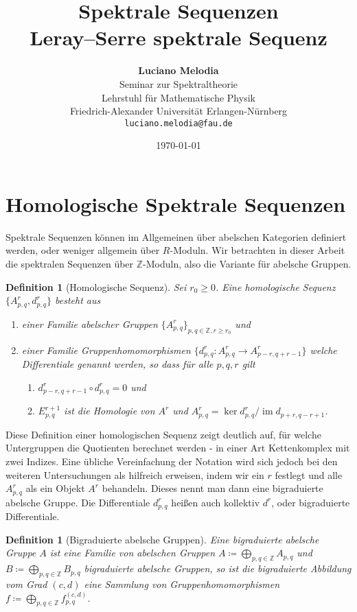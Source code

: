\documentclass[12pt, hidelinks]{article}
\title{\textbf{Spektrale Sequenzen\\ Leray–Serre spektrale Sequenz}}
\author{
\textbf{Luciano Melodia} \\
Seminar zur Spektraltheorie \\
Lehrstuhl für Mathematische Physik \\
Friedrich-Alexander Universität Erlangen-Nürnberg \\
\texttt{luciano.melodia@fau.de}}
\date{\today}
\numberwithin{conj}{section}
\newtheorem{definition}[conj]{Definition}
\newcommand{\Z}{\mathbb{Z}}
\newcommand{\ima}{\operatorname{im}}
\begin{document}
\hypersetup{bookmarksnumbered=true,}
\maketitle

\begin{Large}
\tableofcontents
\end{Large}

\section{Homologische Spektrale Sequenzen}
Spektrale Sequenzen können im Allgemeinen über abelschen Kategorien definiert werden, oder weniger allgemein über $R$-Moduln. Wir betrachten in dieser Arbeit die spektralen Sequenzen über $\mathbb{Z}$-Moduln, also die Variante für abelsche Gruppen.

\begin{definition}[Homologische Sequenz]
\label{homologischeSequenz}
Sei $r_0 \geq 0$. Eine homologische Sequenz $\{A^r_{p,q}, d^r_{p,q}\}$ besteht aus
\begin{enumerate}[nolistsep]
    \item einer Familie abelscher Gruppen $\{A^r_{p,q}\}_{p,q \in \Z, r \geq r_0}$ und
    \item einer Familie Gruppenhomomorphismen $\{d^r_{p,q}: A^r_{p,q} \to A^r_{p-r,q+r-1}\}$ welche Differentiale genannt werden, so dass für alle $p,q,r$ gilt
    \begin{enumerate}[nolistsep]
        \item $d^r_{p-r,q+r-1} \circ d^r_{p,q} = 0$ und
        \item $E^{r+1}_{p,q}$ ist die Homologie von $A^r$ und $A^r_{p,q} = \ker d^r_{p,q} / \ima d_{p+r,q-r+1}$.
    \end{enumerate}
\end{enumerate}
\end{definition}

Diese Definition einer homologischen Sequenz zeigt deutlich auf, für welche Untergruppen die Quotienten berechnet werden - in einer Art Kettenkomplex mit zwei Indizes. Eine übliche Vereinfachung der Notation wird sich jedoch bei den weiteren Untersuchungen als hilfreich erweisen, indem wir ein $r$ festlegt und alle $A^r_{p,q}$ als ein Objekt $A^r$ behandeln. Dieses nennt man dann eine bigraduierte abelsche Gruppe. Die Differentiale $d^r_{p,q}$ heißen auch kollektiv $d^r$, oder bigraduierte Differentiale.

\begin{definition}[Bigraduierte abelsche Gruppen]
    Eine bigraduierte abelsche Gruppe $A$ ist eine Familie von abelschen Gruppen $A \coloneq \bigoplus_{p,q \in \Z} A_{p,q}$ und $B \coloneq \bigoplus_{p,q \in \Z} B_{p,q}$ bigraduierte abelsche Gruppen, so ist die bigraduierte Abbildung vom Grad $(c,d)$ eine Sammlung von Gruppenhomomorphismen $f \coloneq \bigoplus_{p,q \in \Z} f^{(c,d)}_{p,q}$.
\end{definition}
\end{document}
